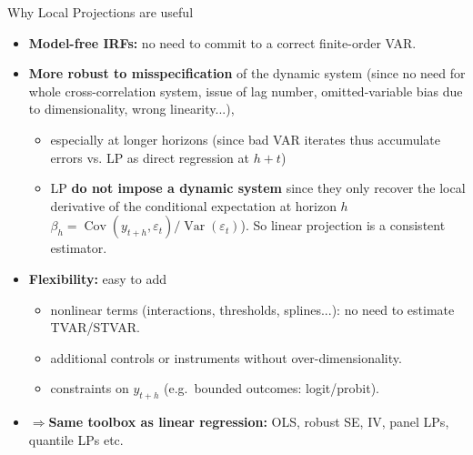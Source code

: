 \documentclass{beamer}
\begin{document}
\begin{frame}{Why Local Projections are useful}
\small

\begin{itemize}
  \item \textbf{Model-free IRFs:} no need to commit to a correct finite-order VAR.
  \item \textbf{More robust to misspecification} of the dynamic system (since no need for whole cross-correlation system, issue of lag number, omitted-variable bias due to dimensionality, wrong linearity...),
  \begin{itemize}
      \item  especially at longer horizons (since bad VAR iterates thus accumulate errors vs. LP as direct regression at $h+t$)
      \item LP \textbf{do not impose a dynamic system} since they only recover the local derivative of the conditional expectation at horizon \(h\) \(\beta_h = \operatorname{Cov}(y_{t+h}, \varepsilon_t)/\operatorname{Var}(\varepsilon_t)\)).  So linear projection is a consistent estimator.
  \end{itemize}
  \item \textbf{Flexibility:} easy to add
        \begin{itemize}
          \item nonlinear terms (interactions, thresholds, splines...): no need to estimate TVAR/STVAR.
          \item additional controls or instruments without over-dimensionality.
          \item constraints on $y_{t+h}$ (e.g.\ bounded outcomes: logit/probit).
        \end{itemize}
  \item $\Rightarrow$\textbf{Same toolbox as linear regression:} OLS, robust SE, IV, panel LPs, quantile LPs etc.
\end{itemize}
\end{frame}
\end{document}

